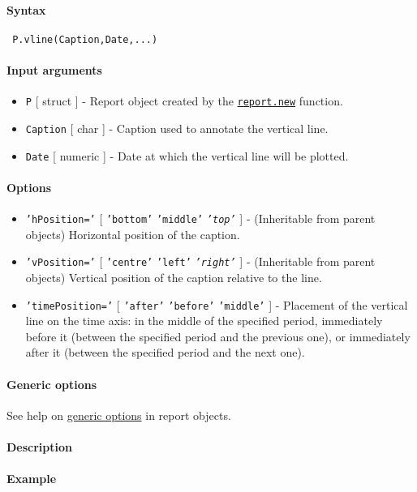 


	\paragraph{Syntax}
 
 \begin{verbatim}
 P.vline(Caption,Date,...)
 \end{verbatim}
 
 \paragraph{Input arguments}
 
 \begin{itemize}
 \item
   \texttt{P} {[} struct {]} - Report object created by the
   \href{report/new}{\texttt{report.new}} function.
 \item
   \texttt{Caption} {[} char {]} - Caption used to annotate the vertical
   line.
 \item
   \texttt{Date} {[} numeric {]} - Date at which the vertical line will
   be plotted.
 \end{itemize}
 
 \paragraph{Options}
 
 \begin{itemize}
 \item
   \texttt{'hPosition='} {[} \texttt{'bottom'} \textbar{}
   \texttt{'middle'} \textbar{} \emph{\texttt{'top'}} {]} - (Inheritable
   from parent objects) Horizontal position of the caption.
 \item
   \texttt{'vPosition='} {[} \texttt{'centre'} \textbar{} \texttt{'left'}
   \textbar{} \emph{\texttt{'right'}} {]} - (Inheritable from parent
   objects) Vertical position of the caption relative to the line.
 \item
   \texttt{'timePosition='} {[} \texttt{'after'} \textbar{}
   \texttt{'before'} \textbar{} \texttt{'middle'} {]} - Placement of the
   vertical line on the time axis: in the middle of the specified period,
   immediately before it (between the specified period and the previous
   one), or immediately after it (between the specified period and the
   next one).
 \end{itemize}
 
 \paragraph{Generic options}
 
 See help on \href{report/Contents}{generic options} in report objects.
 
 \paragraph{Description}
 
 \paragraph{Example}


